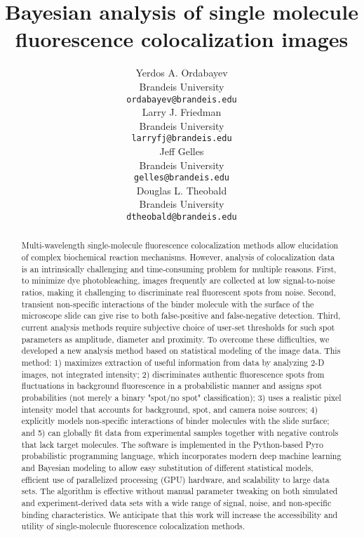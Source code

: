 \documentclass{article}
\title{Bayesian analysis of single molecule fluorescence  colocalization images}
\author{
 Yerdos A. Ordabayev \\
  Brandeis University\\
  \texttt{ordabayev@brandeis.edu} \\
   \And
 Larry  J. Friedman \\
  Brandeis University\\
  \texttt{larryfj@brandeis.edu} \\
  \And
 Jeff Gelles \\
  Brandeis University\\
  \texttt{gelles@brandeis.edu} \\
  \And
 Douglas L. Theobald \\
  Brandeis University\\
  \texttt{dtheobald@brandeis.edu} \\
}
\begin{document}
\maketitle
\begin{abstract} %
Multi-wavelength single-molecule fluorescence colocalization methods allow elucidation of complex biochemical reaction mechanisms. However, analysis of colocalization data is an intrinsically challenging and time-consuming problem for multiple reasons. First, to minimize dye photobleaching, images frequently are collected at low signal-to-noise ratios, making it challenging to discriminate real fluorescent spots from noise. Second, transient non-specific interactions of the binder molecule with the surface of the microscope slide can give rise to both false-positive and false-negative detection. Third, current analysis methods require subjective choice of user-set thresholds for such spot parameters as amplitude, diameter and proximity. To overcome these difficulties, we developed a new analysis method based on statistical modeling of the image data. This method: 1) maximizes extraction of useful information from data by analyzing 2-D images, not integrated intensity; 2) discriminates authentic fluorescence spots from fluctuations in background fluorescence in a probabilistic manner and assigns spot probabilities (not merely a binary "spot/no spot" classification); 3) uses a realistic pixel intensity model that accounts for background, spot, and camera noise sources; 4) explicitly models non-specific interactions of binder molecules with the slide surface; and 5) can globally fit data from experimental samples together with negative controls that lack target molecules. The software is implemented in the Python-based Pyro probabilistic programming language, which incorporates modern deep machine learning and Bayesian modeling to allow easy substitution of different statistical models, efficient use of parallelized processing (GPU) hardware, and scalability to large data sets. The algorithm is effective without manual parameter tweaking on both simulated and experiment-derived data sets with a wide range of signal, noise, and non-specific binding characteristics. We anticipate that this work will increase the accessibility and utility of single-molecule fluorescence colocalization methods.
\end{abstract}




















\end{document}
